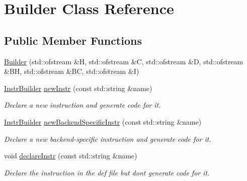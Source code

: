 \hypertarget{class_builder}{}\section{Builder Class Reference}
\label{class_builder}
\subsection*{Public Member Functions}
\begin{DoxyCompactItemize}
\item 
\hyperlink{class_builder_ad8b47f32295c7b773fa6d504bb347c70}{Builder} (std\+::ofstream \&H, std\+::ofstream \&C, std\+::ofstream \&D, std\+::ofstream \&BH, std\+::ofstream \&BC, std\+::ofstream \&I)
\item 
\mbox{\label{class_builder_aad0dea44e77bb3b3764f789f990d030c}} 
\hyperlink{class_instr_builder}{Instr\+Builder} \hyperlink{class_builder_aad0dea44e77bb3b3764f789f990d030c}{new\+Instr} (const std\+::string \&name)
\begin{DoxyCompactList}\small\item\em Declare a new instruction and generate code for it. \end{DoxyCompactList}\item 
\mbox{\label{class_builder_a069d21eea35c18677834e111e19470a7}} 
\hyperlink{class_instr_builder}{Instr\+Builder} \hyperlink{class_builder_a069d21eea35c18677834e111e19470a7}{new\+Backend\+Specific\+Instr} (const std\+::string \&name)
\begin{DoxyCompactList}\small\item\em Declare a new backend-\/specific instruction and generate code for it. \end{DoxyCompactList}\item 
\mbox{\label{class_builder_a1daf38f32fb67e66aab8a09816c2da89}} 
void \hyperlink{class_builder_a1daf38f32fb67e66aab8a09816c2da89}{declare\+Instr} (const std\+::string \&name)
\begin{DoxyCompactList}\small\item\em Declare the instruction in the def file but don\textquotesingle{}t generate code for it. \end{DoxyCompactList}\item 
\mbox{\label{class_builder_adf3bbe78f298430862ea6a9b2729164a}} 

\end{DoxyCompactItemize}
